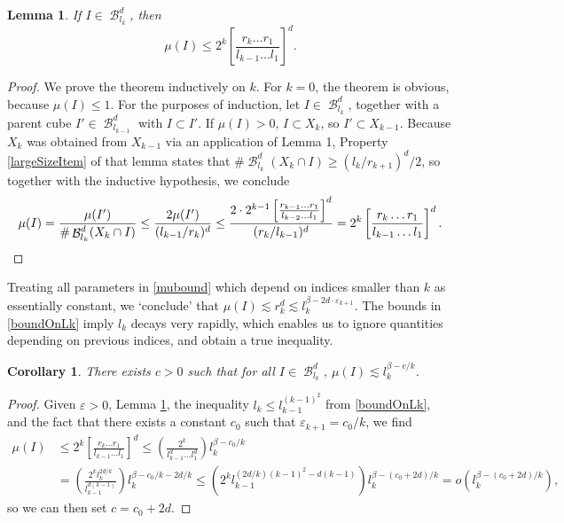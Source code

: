 \documentclass[dvipsnames,letterpaper,12pt]{article}
\numberwithin{equation}{section}
\theoremstyle{plain}
\newtheorem{lemma}{Lemma}
\newtheorem{corollary}{Corollary}
\DeclareMathOperator{\B}{\mathcal{B}}
\begin{document}
\begin{lemma} \label{mubound}
	If $I \in \B^d_{l_k}$, then
\[		\mu(I) \leq 2^k \left[ \frac{r_k \dots r_1}{l_{k-1} \dots l_1} \right]^d. \]
\end{lemma}
\begin{proof}
	We prove the theorem inductively on $k$. For $k = 0$, the theorem is obvious, because $\mu(I) \leq 1$. For the purposes of induction, let $I \in \B^d_{l_k}$, together with a parent cube $I' \in \B^d_{l_{k-1}}$ with $I \subset I'$. If $\mu(I) > 0$, $I \subset X_k$, so $I' \subset X_{k-1}$. Because $X_k$ was obtained from $X_{k-1}$ via an application of Lemma 1, Property \ref{largeSizeItem} of that lemma states that $\# \B^d_{l_k}(X_k \cap I) \geq (l_k/r_{k+1})^d/2$, so together with the inductive hypothesis, we conclude
\[		\mu(I) = \frac{\mu(I')}{\# \B^d_{l_k}(X_k \cap I)} \leq \frac{2 \mu(I')}{(l_{k-1}/r_k)^d} \leq \frac{2 \cdot 2^{k-1} \left[ \frac{r_{k-1} \dots r_1}{l_{k-2} \dots l_1} \right]^d}{(r_k/l_{k-1})^d} = 2^k \left[ \frac{r_k \dots r_1}{l_{k-1} \dots l_1} \right]^d. \qedhere \]
\end{proof}

Treating all parameters in \eqref{mubound} which depend on indices smaller than $k$ as essentially constant, we `conclude' that $\mu(I) \lesssim r_k^d \lesssim l_k^{\beta - 2d \cdot \varepsilon_{k+1}}$. The bounds in \eqref{boundOnLk} imply $l_k$ decays very rapidly, which enables us to ignore quantities depending on previous indices, and obtain a true inequality.

\begin{corollary}
	There exists $c > 0$ such that for all $I \in \B^d_{l_k}$, $\mu(I) \lesssim l_k^{\beta - c/k}$.
\end{corollary}
\begin{proof}
	Given $\varepsilon > 0$, Lemma \ref{mubound}, the inequality $l_k \leq l_{k-1}^{(k-1)^2}$ from \eqref{boundOnLk}, and the fact that there exists a constant $c_0$ such that $\varepsilon_{k+1} = c_0/k$, we find
	\begin{align*}
		\mu(I) &\leq 2^k \left[ \frac{r_k \dots r_1}{l_{k-1} \dots l_1} \right]^d \leq \left( \frac{2^k}{l_{k-1}^d \dots l_1^d} \right) l_k^{\beta - c_0/k}\\
		&= \left( \frac{2^k l_k^{2d/k}}{l_{k-1}^{d(k-1)}} \right) l_k^{\beta - c_0/k - 2d/k} \leq \left( 2^k l_{k-1}^{(2d/k)(k-1)^2 - d(k-1)} \right) l_k^{\beta - (c_0 + 2d)/k} = o \left(l_k^{\beta - (c_0 + 2d)/k} \right), %
	\end{align*}
	so we can then set $c = c_0 + 2d$.
\end{proof}
\end{document}
